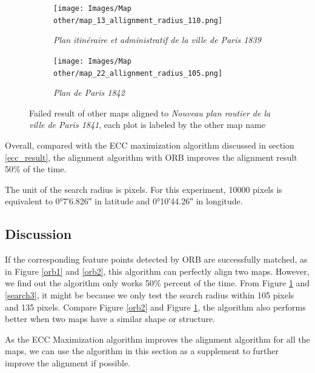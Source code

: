 \begin{figure}[h!]
     \centering
     \captionsetup{width=.9\textwidth, justification=centering}
     \begin{subfigure}{0.9\textwidth}
         \centering
         \texttt{[image: Images/Map other/map\_13\_allignment\_radius\_110.png]}
         \caption{\textit{Plan itinéraire et administratif de la ville de Paris 1839}}
     \end{subfigure}
     \hfill
     \begin{subfigure}{0.9\textwidth}
         \centering
         \texttt{[image: Images/Map other/map\_22\_allignment\_radius\_105.png]}
         \caption{\textit{Plan de Paris 1842}}
     \end{subfigure}
        \caption{Failed result of other maps aligned to \textit{Nouveau plan routier de la ville de Paris 1841}, each plot is labeled by the other map name}
        \label{orb3}
\end{figure}


Overall, compared with the ECC maximization algorithm discussed in section \ref{ecc_result}, the alignment algorithm with ORB improves the alignment result 50\% of the time.


The unit of the search radius is pixels. For this experiment, 10000 pixels is equivalent to \ang{0;7;6.826} in latitude and \ang{0;10;44.26} in longitude.

\subsection{Discussion}

If the corresponding feature points detected by ORB are successfully matched, as in Figure \ref{orb1} and \ref{orb2}, this algorithm can perfectly align two maps. However, we find out the algorithm only works 50\% percent of the time. From Figure \ref{orb3} and \ref{search3}, it might be because we only test the search radius within 105 pixels and 135 pixels. Compare Figure \ref{orb2} and Figure \ref{orb3}, the algorithm also performs better when two maps have a similar shape or structure.

As the ECC Maximization algorithm improves the alignment algorithm for all the maps, we can use the algorithm in this section as a supplement to further improve the alignment if possible.

